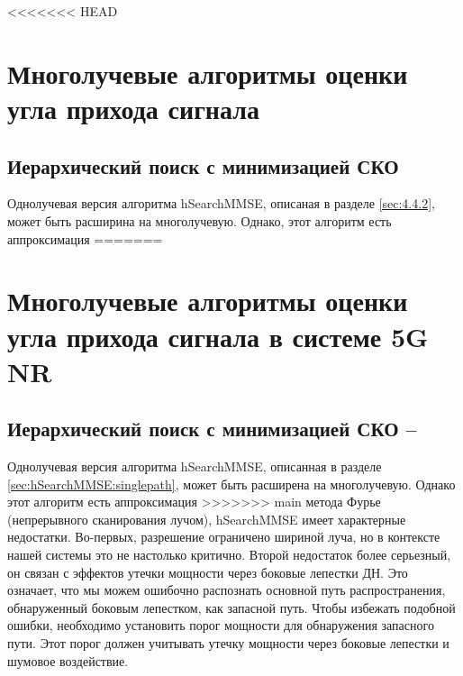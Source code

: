 <<<<<<< HEAD
\section{Многолучевые алгоритмы оценки угла прихода сигнала}
\subsection{Иерархический поиск с минимизацией СКО}

Однолучевая версия алгоритма hSearchMMSE, описаная в разделе \ref{sec:4.4.2},
может быть расширина на многолучевую.  Однако, этот алгоритм есть аппроксимация
=======
\section{Многолучевые алгоритмы оценки угла прихода сигнала в системе 5G NR}
\subsection[Иерархический поиск с минимизацией СКО]{Иерархический поиск с минимизацией СКО -- \hSearchMMSE{}}
\label{sec:hSearchMMSE:multipath}

Однолучевая версия алгоритма hSearchMMSE, описанная в разделе
\ref{sec:hSearchMMSE:singlepath},
может быть расширена на многолучевую.  Однако этот алгоритм есть аппроксимация
>>>>>>> main
метода Фурье (непрерывного сканирования лучом), hSearchMMSE имеет характерные
недостатки.  Во-первых, разрешение ограничено шириной луча, но в контексте нашей
системы это не настолько критично. Второй недостаток более серьезный, он связан
с эффектов утечки мощности через боковые лепестки ДН.  Это означает, что мы
можем ошибочно распознать основной путь распространения, обнаруженный боковым
лепестком, как запасной путь.  Чтобы избежать подобной ошибки, необходимо
установить порог мощности для обнаружения запасного пути. Этот порог должен
учитывать утечку мощности через боковые лепестки и шумовое воздействие.

